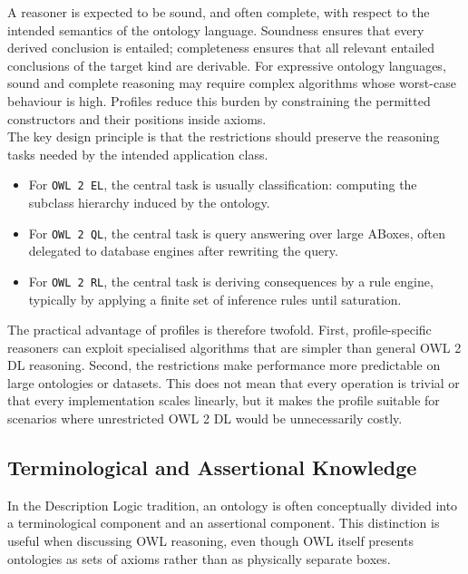 \documentclass{scrbook}
\begin{document}
	A reasoner is expected to be sound, and often complete, with respect to the intended semantics of the ontology language. Soundness ensures that every derived conclusion is entailed; completeness ensures that all relevant entailed conclusions of the target kind are derivable. For expressive ontology languages, sound and complete reasoning may require complex algorithms whose worst-case behaviour is high. Profiles reduce this burden by constraining the permitted constructors and their positions inside axioms.\\
	
	The key design principle is that the restrictions should preserve the reasoning tasks needed by the intended application class.
	\begin{itemize}
		\item For \texttt{OWL 2 EL}, the central task is usually classification: computing the subclass hierarchy induced by the ontology.
		
		\item For \texttt{OWL 2 QL}, the central task is query answering over large ABoxes, often delegated to database engines after rewriting the query.
		
		\item For \texttt{OWL 2 RL}, the central task is deriving consequences by a rule engine, typically by applying a finite set of inference rules until saturation.
	\end{itemize}
	
	The practical advantage of profiles is therefore twofold. First, profile-specific reasoners can exploit specialised algorithms that are simpler than general OWL 2 DL reasoning. Second, the restrictions make performance more predictable on large ontologies or datasets. This does not mean that every operation is trivial or that every implementation scales linearly, but it makes the profile suitable for scenarios where unrestricted OWL 2 DL would be unnecessarily costly.
	
	\subsection{Terminological and Assertional Knowledge}
	
	In the Description Logic tradition, an ontology is often conceptually divided into a terminological component and an assertional component. This distinction is useful when discussing OWL reasoning, even though OWL itself presents ontologies as sets of axioms rather than as physically separate boxes.\\
	
\end{document}
